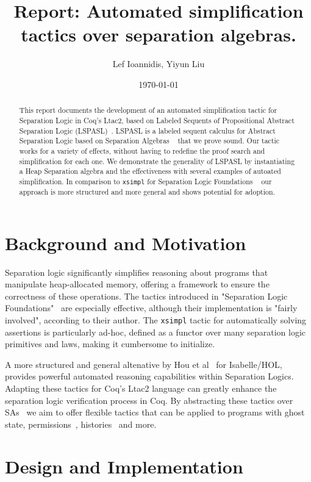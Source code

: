 \documentclass[12pt,lettersize]{article}
\title{Report: Automated simplification tactics over separation algebras.}
\author{Lef Ioannidis, Yiyun Liu}
\date{\today}
\begin{document}
\maketitle

\begin{abstract}
This report documents the development of an automated simplification tactic for Separation Logic in Coq's Ltac2, based on 
Labeled Sequents of Propositional Abstract Separation Logic (LSPASL)~\cite{hou2017proof}. LSPASL is a labeled sequent calculus
for Abstract Separation Logic based on Separation Algebras ~\cite{calcagno2007local} that we prove sound. Our tactic works for 
a variety of effects, without having to redefine the proof search and simplification for each one. We demonstrate the generality of LSPASL
by instantiating a Heap Separation algebra and the effectiveness with several examples of autoated simplification.
In comparison to \texttt{xsimpl} for Separation Logic Foundations ~\cite{chargueraud2020separation}
our approach is more structured and more general and shows potential for adoption.
\end{abstract}

\section{Background and Motivation}
Separation logic significantly simplifies reasoning about programs that manipulate heap-allocated memory, offering a framework
to ensure the correctness of these operations. The tactics introduced in "Separation Logic Foundations"~\cite{chargueraud2020separation}
are especially effective, although their implementation is "fairly involved", according to their author. The \texttt{xsimpl} tactic
for automatically solving assertions is particularly ad-hoc, defined as a functor over many separation logic primitives and laws,
making it cumbersome to initialize.

A more structured and general altenative by Hou et al~\cite{hou2017proof} for Isabelle/HOL, provides powerful automated reasoning
capabilities within Separation Logics. Adapting these tactics for Coq's Ltac2 language can greatly enhance the separation logic verification process in Coq.
By abstracting these tactics over SAs~\cite{calcagno2007local} we aim to offer
flexible tactics that can be applied to programs with ghost state, permissions~\cite{bornat2005permission}, 
histories~\cite{sergey2015specifying} and more.

\section{Design and Implementation}
\end{document}
